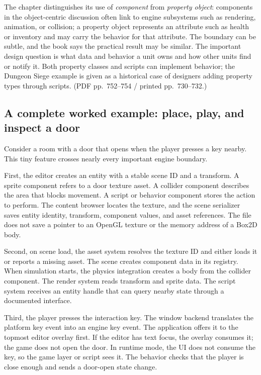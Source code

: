 The chapter distinguishes its use of \emph{component} from \emph{property object}: components in the object-centric discussion often link to engine subsystems such as rendering, animation, or collision; a property object represents an attribute such as health or inventory and may carry the behavior for that attribute. The boundary can be subtle, and the book says the practical result may be similar. The important design question is what data and behavior a unit owns and how other units find or notify it. Both property classes and scripts can implement behavior; the Dungeon Siege example is given as a historical case of designers adding property types through scripts. (PDF pp.~752--754 / printed pp.~730--732.)

\subsection{A complete worked example: place, play, and inspect a door}\label{06-engine-ii-ch041-a-complete-worked-example-place-play-and-inspect-a-door}

\hypertarget{06-engine-ii-ch041-a-complete-worked-example-place-play-and-inspect-a-door}{}

Consider a room with a door that opens when the player presses a key nearby. This tiny feature crosses nearly every important engine boundary.

First, the editor creates an entity with a stable scene ID and a transform. A sprite component refers to a door texture asset. A collider component describes the area that blocks movement. A script or behavior component stores the action to perform. The content browser locates the texture, and the scene serializer saves entity identity, transform, component values, and asset references. The file does not save a pointer to an OpenGL texture or the memory address of a Box2D body.

Second, on scene load, the asset system resolves the texture ID and either loads it or reports a missing asset. The scene creates component data in its registry. When simulation starts, the physics integration creates a body from the collider component. The render system reads transform and sprite data. The script system receives an entity handle that can query nearby state through a documented interface.

Third, the player presses the interaction key. The window backend translates the platform key event into an engine key event. The application offers it to the topmost editor overlay first. If the editor has text focus, the overlay consumes it; the game does not open the door. In runtime mode, the UI does not consume the key, so the game layer or script sees it. The behavior checks that the player is close enough and sends a door-open state change.

